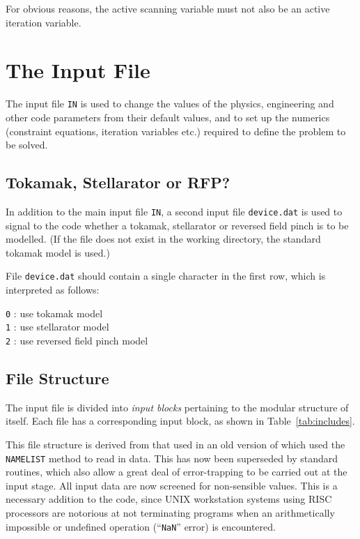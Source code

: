For obvious reasons, the active scanning variable must not also be an active
iteration variable.


\section{The Input File}
\label{sec:infile}

The input file \texttt{IN} is used to change the values of the physics,
engineering and other code parameters from their default values, and to set up
the numerics (constraint equations, iteration variables etc.) required to
define the problem to be solved.

\subsection{Tokamak, Stellarator or RFP?}

In addition to the main input file \texttt{IN}, a second input file
\texttt{device.dat} is used to signal to the code whether a tokamak,
stellarator or reversed field pinch is to be modelled. (If the file does not
exist in the working directory, the standard tokamak model is used.)

File \texttt{device.dat} should contain a single character in the first
row, which is interpreted as follows:
\begin{tabbing}
\hspace{15mm}\= \texttt{0} : use tokamak model \\
\> \texttt{1} : use stellarator model \\
\> \texttt{2} : use reversed field pinch model
\end{tabbing}

\subsection{File Structure}

The input file is divided into {\it input blocks}\/ pertaining to the modular
structure of \PS itself. Each \INCLUDE file has a corresponding input block,
as shown in Table~\ref{tab:includes}.

This file structure is derived from that used in an old version of
\PSC which used the {\tt NAMELIST} method to read in data. This has
now been superseded by \FTSS standard routines, which also allow a great deal
of error-trapping to be carried out at the input stage.  All input data are
now screened for non-sensible values. This is a necessary addition to the
code, since UNIX workstation systems using RISC processors are notorious at
not terminating programs when an arithmetically impossible or undefined
operation (``{\tt NaN}'' error) is encountered.

